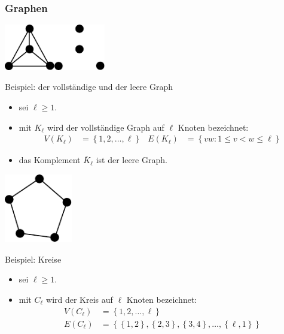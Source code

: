 \documentclass[aspectratio=1610, 11pt]{beamer}
\newcommand\cbc[1]{\left\{{#1}\right\}}
\newcommand{\mytitle}{Graphen}
\begin{document}
\begin{frame}\frametitle{\mytitle}
	\begin{overprint}
	\includegraphics[height=20mm]{images/k4.pdf}\hfill\includegraphics[height=20mm]{images/e4.pdf}
	\begin{exampleblock}{Beispiel: der vollst\"andige und der leere Graph}
		\begin{itemize}
			\item sei $\ell\geq1$.
			\item mit $K_\ell$ wird der \alert{vollst\"andige Graph} auf $\ell$ Knoten bezeichnet:
				\begin{align*}
					V(K_\ell)&=\cbc{1,2,\ldots,\ell}&
					E(K_\ell)&=\cbc{vw:1\leq v<w\leq\ell}
				\end{align*}
			\item das Komplement $\bar K_\ell$ ist der \alert{leere Graph}.
		\end{itemize}
	\end{exampleblock}
	\hfill\includegraphics[height=30mm]{images/c5.pdf}
	\begin{exampleblock}{Beispiel: Kreise}
		\begin{itemize}
			\item sei $\ell\geq1$.
			\item mit $C_\ell$ wird der \alert{Kreis} auf $\ell$ Knoten bezeichnet:
				\begin{align*}
					V(C_\ell)&=\cbc{1,2,\ldots,\ell}\\
					E(C_\ell)&=\cbc{\cbc{1,2},\cbc{2,3},\cbc{3,4},\ldots,\cbc{\ell,1}}
				\end{align*}
		\end{itemize}
	\end{exampleblock}

\end{overprint}
\end{frame}
\end{document}
